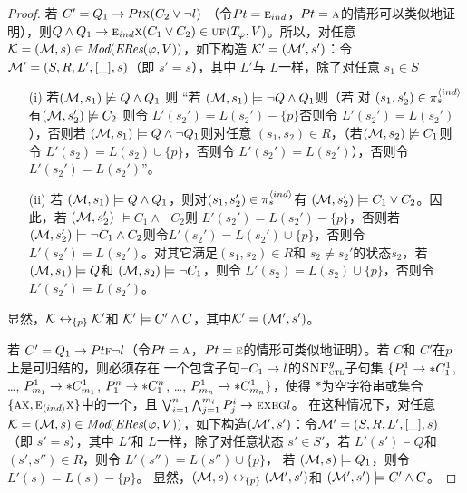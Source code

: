 \begin{proof}
	若 $C'= Q_1\rightarrow Pt \textsc{x} (C_2 \vee \neg l)$ （令$Pt=\textsc{e}_{ind}$，$Pt = \textsc{a}$的情形可以类似地证明），则$Q \wedge Q_1 \rightarrow \textsc{e}_{ind} \textsc{x}(C_1 \vee C_2) \in \textsc{uf}(T_\varphi,V)$。所以，对任意 ${\cal K}=({\cal M}, s)\in \textit{Mod}(\emph{ERes}(\varphi,V))$，如下构造 ${\cal K}'=({\cal M}',s')$：令${\cal M}'= (S, R, L', [\_], s)$（即 $s'=s$），其中 $L'$与 $L$一样，除了对任意 $s_1\in S$
	\begin{itemize}
		\item[(i)] 若$({\cal M}, s_1) \not \models Q \wedge Q_1$ 则 “若 $({\cal M}, s_1) \models \neg Q \wedge Q_1$则（若 对 $(s_1, s_2') \in \pi_s^{{\langle{ind}\rangle}}$有$({\cal M}, s_2') \not \models C_2$  则令 $L'(s_2') = L(s_2') - \{p\}$否则令 $L'(s_2') = L(s_2')$），否则若 $({\cal M}, s_1) \models Q \wedge \neg Q_1$则对任意 $(s_1, s_2) \in R$，（若$({\cal M}, s_2) \not \models C_1$则令 $L'(s_2) = L(s_2) \cup \{p\}$，否则令 $L'(s_2') = L(s_2')$），否则令 $L'(s_2') = L(s_2')$”。
		\item[(ii)] 若 $({\cal M}, s_1) \models Q \wedge Q_1$，则对$(s_1, s_2') \in \pi_s^{{\langle{ind}\rangle}}$有 $({\cal M},s_2') \models C_1 \vee C_2$。因此，若 $({\cal M}, s_2')$ $\models C_1 \wedge \neg C_2$则 $L'(s_2') = L(s_2') - \{p\}$，否则若 $({\cal M}, s_2') \models \neg C_1 \wedge C_2$则令$L'(s_2') = L(s_2') \cup \{p\}$，否则令 $L'(s_2') = L(s_2')$。对其它满足$(s_1, s_2) \in R$和 $s_2 \not = s_2'$的状态$s_2$，若 $({\cal M}, s_1) \models Q$和 $({\cal M}, s_2) \models \neg C_1$，则令 $L'(s_2) = L(s_2) \cup \{p\}$，否则令 $L'(s_2') = L(s_2')$。
	\end{itemize}
	显然，${\cal K} \leftrightarrow_{\{p\}} {\cal K}'$和 ${\cal K}' \models C' \wedge C$，其中${\cal K}' = ({\cal M}',s')$。
	
	若 $C' =  Q_1\rightarrow Pt \textsc{f} \neg l$（令$Pt=\textsc{a}$，$Pt = \textsc{e}$的情形可类似地证明）。若 $C$和 $C'$在$p$上是可归结的，则必须存在 一个包含子句$\neg C_1 \rightarrow l$的${\textsc{SNF}_{\textsc{ctl}}^g}$子句集 $\{P_1^1 \rightarrow * C_1^1$, \dots, $P_{m_1}^1 \rightarrow * C_{m_1}^1$, $P_1^n \rightarrow * C_1^n$, \dots, $P_{m_n}^1 \rightarrow * C_{m_n}^1 \}$，使得 $*$为空字符串或集合 $\{\textsc{a} \textsc{x}, \textsc{e}_{{\langle{ind}\rangle}} \textsc{x}\}$中的一个，且 $\bigvee_{i=1}^n \bigwedge_{j=1}^{m_i} P_j^i \rightarrow \textsc{e} \textsc{x} \textsc{e} \textsc{g} l$。
	在这种情况下，对任意${\cal K}=({\cal M}, s)\in \textit{Mod}(\emph{ERes}(\varphi,V))$，如下构造$({\cal M}',s')$：令${\cal M}'= (S, R, L', [\_],s)$ （即 $s'=s$），其中  $L'$和 $L$一样，除了对任意状态 $s'\in S'$，若 $L'(s') \models Q$和 $(s',s'') \in R$，则令 $L'(s'') = L(s'') \cup \{p\}$， 若 $({\cal M},s)\models Q_1$，则令 $L'(s) = L(s) - \{p\}$。
	显然，$({\cal M}, s) \leftrightarrow_{\{p\}} ({\cal M}', s')$和 $({\cal M}',s') \models C' \wedge C$。	
	

\end{proof}
